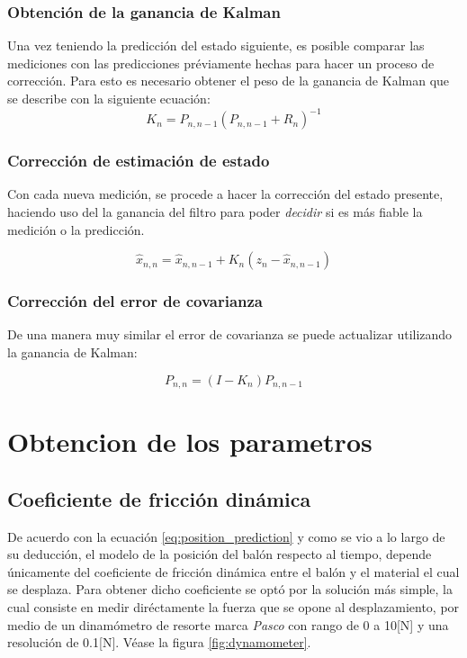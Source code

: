 		\subsubsection*{Obtención de la ganancia de Kalman}
	Una vez teniendo la predicción del estado siguiente, es posible comparar las mediciones con las predicciones préviamente hechas para hacer un proceso de corrección. Para esto es necesario obtener el peso de la ganancia de Kalman que se describe con la siguiente ecuación:
\begin{equation}
	K_n = P_{n,n-1} (P_{n,n-1} + R_n)^{-1}
\end{equation}


		\subsubsection*{Corrección de estimación de estado}
	Con cada nueva medición, se procede a hacer la corrección del estado presente, haciendo uso del la ganancia del filtro para poder \textit{decidir} si es más fiable la medición o la predicción.

\begin{equation}
\hat{x}_{n,n} = \hat{x}_{n,n-1} + K_n(z_n - \hat{x}_{n,n-1})
\end{equation}
	
		\subsubsection*{Corrección del error de covarianza}
	De una manera muy similar el error de covarianza se puede actualizar utilizando la ganancia de Kalman:

\begin{equation}
P_{n,n} = (I - K_n) P_{n,n-1}
\end{equation}

	\section{Obtencion de los parametros}
		\subsection*{Coeficiente de fricción dinámica}
	De acuerdo con la ecuación \ref{eq:position_prediction} y como se vio a lo largo de su deducción, el modelo de la posición del balón respecto al tiempo, depende únicamente del coeficiente de fricción dinámica entre el balón y el material el cual se desplaza. Para obtener dicho coeficiente se optó por la solución más simple, la cual consiste en medir diréctamente la fuerza que se opone al desplazamiento, por medio de un dinamómetro de resorte marca \textit{Pasco} con rango de 0 a 10[N] y una resolución de 0.1[N]. Véase la figura \ref{fig:dynamometer}. 
	
